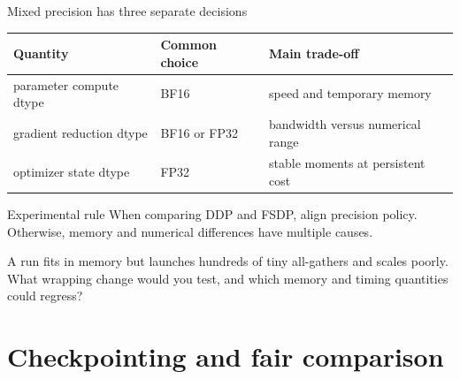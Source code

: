 \documentclass[handout]{beamer}
\begin{document}
\begin{frame}{Mixed precision has three separate decisions}
  \small
  \begin{tabular}{@{}>{\raggedright\arraybackslash}p{.30\linewidth}>{\raggedright\arraybackslash}p{.22\linewidth}>{\raggedright\arraybackslash}p{.38\linewidth}@{}}
    \toprule
    Quantity & Common choice & Main trade-off \\
    \midrule
    parameter compute dtype & BF16 & speed and temporary memory \\
    gradient reduction dtype & BF16 or FP32 & bandwidth versus numerical range \\
    optimizer state dtype & FP32 & stable moments at persistent cost \\
    \bottomrule
  \end{tabular}
  \vfill
  \begin{block}{Experimental rule}
    When comparing DDP and FSDP, align precision policy. Otherwise, memory and numerical differences have multiple causes.
  \end{block}
\end{frame}

  {A run fits in memory but launches hundreds of tiny all-gathers and scales poorly. What wrapping change would you test, and which memory and timing quantities could regress?}

\section{Checkpointing and fair comparison}
\end{document}

